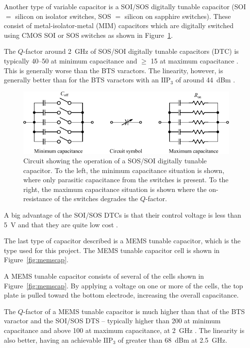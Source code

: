 Another type of variable capacitor is a SOI/SOS digitally tunable capacitor (SOI $=$ silicon on isolator switches, SOS $=$ silicon on sapphire switches). These consist of metal-isolator-metal (MIM) capacitors which are digitally switched using CMOS SOI or SOS switches as shown in Figure~\ref{fig:sossoiswitch}. 

The $Q$-factor around \SI{2}{GHz} of SOS/SOI digitally tunable capacitors (DTC) is typically 40--50 at minimum capacitance and $\geq$ 15 at maximum capacitance \cite{gu2014rf}. This is generally worse than the BTS varactors. The linearity, however, is generally better than for the BTS varactors with an $\text{IIP}_3$ of around \SI{44}{dBm} \cite{gu2014rf}.

\begin{figure}[htbp]
    \centering
    \includegraphics{img/analysis/sossoi_dtc}
    \caption{Circuit showing the operation of a SOS/SOI digitally tunable capacitor. To the left, the minimum capacitance situation is shown, where only parasitic capacitance from the switches is present. To the right, the maximum capacitance situation is shown where the on-resistance of the switches degrades the $Q$-factor.}
    \label{fig:sossoiswitch}
\end{figure}

A big advantage of the SOI/SOS DTCs is that their control voltage is less than \SI{5}{V} and that they are quite low cost \cite{gu2014rf}.

The last type of capacitor described is a MEMS tunable capacitor, which is the type used for this project. The MEMS tunable capacitor cell is shown in Figure~\ref{fig:memscap}.

A MEMS tunable capacitor consists of several of the cells shown in Figure~\ref{fig:memscap}. By applying a voltage on one or more of the cells, the top plate is pulled toward the bottom electrode, increasing the overall capacitance. 

The $Q$-factor of a MEMS tunable capacitor is much higher than that of the BTS varactor and the SOI/SOS DTS -- typically higher than 200 at minimum capacitance and above 100 at maximum capacitance, at \SI{2}{GHz} \cite{gu2014rf}. The linearity is also better, having an achievable $\text{IIP}_3$ of greater than \SI{68}{dBm} at \SI{2.5}{GHz}. 

